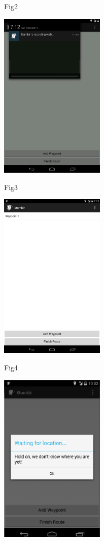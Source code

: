 \documentclass{article}
\begin{document}
	Fig2
	
	\includegraphics[width=5cm]{2}
	
	Fig3
	
	\includegraphics[width=5cm]{3}
	
	Fig4
	
	\includegraphics[width=5cm]{4}
	
\end{document}
